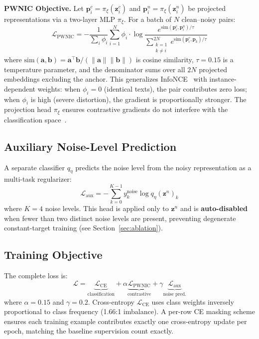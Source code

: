 \documentclass[conference]{IEEEtran}
\begin{document}
\textbf{PWNIC Objective.} Let $\mathbf{p}_i^c = \pi_\xi(\mathbf{z}_i^c)$ and $\mathbf{p}_i^n = \pi_\xi(\mathbf{z}_i^n)$ be projected representations via a two-layer MLP $\pi_\xi$. For a batch of $N$ clean--noisy pairs:
\begin{equation}
\mathcal{L}_{\text{PWNIC}} = -\frac{1}{\sum_{i} \phi_i}
\sum_{i=1}^{N} \phi_i \cdot
\log \frac{e^{\text{sim}(\mathbf{p}_i^c, \mathbf{p}_i^n) / \tau}}
          {\displaystyle\sum_{\substack{k=1 \\ k \neq i}}^{2N}
           e^{\text{sim}(\mathbf{p}_i^c, \mathbf{p}_k) / \tau}}
\label{eq:pwnic}
\end{equation}
where $\text{sim}(\mathbf{a}, \mathbf{b}) = \mathbf{a}^\top \mathbf{b} / (\|\mathbf{a}\| \|\mathbf{b}\|)$ is cosine similarity, $\tau = 0.15$ is a temperature parameter, and the denominator sums over all $2N$ projected embeddings excluding the anchor. This generalizes InfoNCE~\cite{oord2018representation} with instance-dependent weights: when $\phi_i = 0$ (identical texts), the pair contributes zero loss; when $\phi_i$ is high (severe distortion), the gradient is proportionally stronger. The projection head $\pi_\xi$ ensures contrastive gradients do not interfere with the classification space~\cite{chen2020simclr}.

\subsection{Auxiliary Noise-Level Prediction}

A separate classifier $q_\eta$ predicts the noise level from the noisy representation as a multi-task regularizer:
\begin{equation}
    \mathcal{L}_\text{aux} = -\sum_{k=0}^{K-1} y_k^{\text{noise}} \log q_\eta(\mathbf{z}^n)_k
    \label{eq:aux}
\end{equation}
where $K = 4$ noise levels. This head is applied only to $\mathbf{z}^n$ and is \textbf{auto-disabled} when fewer than two distinct noise levels are present, preventing degenerate constant-target training (see Section~\ref{sec:ablation}).

\subsection{Training Objective}

The complete loss is:
\begin{equation}
\mathcal{L} = \underbrace{\mathcal{L}_\text{CE}}_{\text{classification}}
+ \alpha \underbrace{\mathcal{L}_{\text{PWNIC}}}_{\text{contrastive}}
+ \gamma \underbrace{\mathcal{L}_\text{aux}}_{\text{noise pred.}}
\label{eq:total}
\end{equation}
where $\alpha = 0.15$ and $\gamma = 0.2$. Cross-entropy $\mathcal{L}_\text{CE}$ uses class weights inversely proportional to class frequency (1.66:1 imbalance). A per-row CE masking scheme ensures each training example contributes exactly one cross-entropy update per epoch, matching the baseline supervision count exactly.
\end{document}
